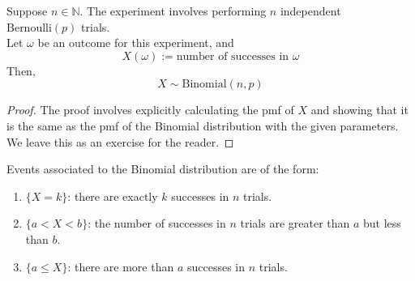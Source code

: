\begin{thm}
    Suppose $n\in \mathbb{N}$. The experiment involves performing $n$ independent $\text{Bernoulli}(p)$ trials. 
    \\
    Let $\omega$ be an outcome for this experiment, and $$X(\omega) := \text{number of successes in $\omega$}$$
    Then, 
    $$X \sim \text{Binomial}(n, p)$$
\end{thm}
\begin{proof}
The proof involves explicitly calculating the pmf of $X$ and showing that it is the same as the pmf of the Binomial distribution with the given parameters. We leave this as an exercise for the reader. 
\end{proof}


Events associated to the Binomial distribution are of the form:
\begin{enumerate}
    \item $\{X = k \}$: there are exactly $k$ successes in $n$ trials. 
    \item $\{a < X < b\}$: the number of successes in $n$ trials are greater  than $a$ but less than $b$.
    \item $\{a \le X\}$: there are more than $a$ successes in $n$ trials.
\end{enumerate}


